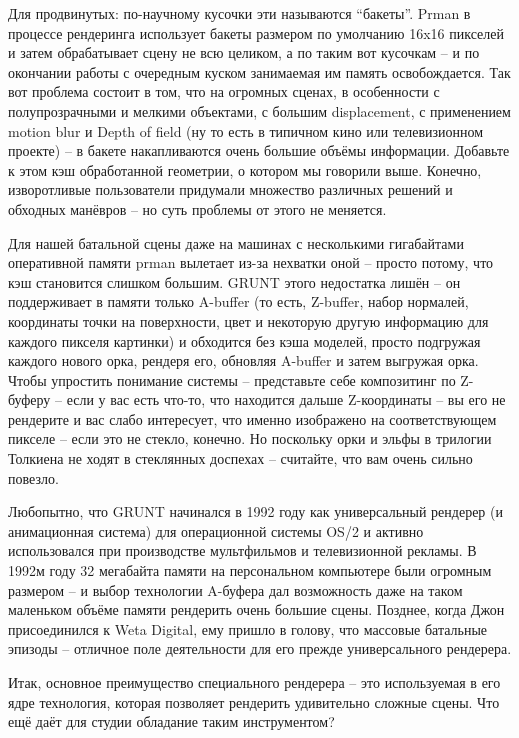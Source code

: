  Для
    продвинутых: по-научному
    кусочки  эти называются
    “бакеты”. Prman в процессе
    рендеринга использует бакеты размером по умолчанию 16x16 пикселей и
    затем обрабатывает сцену не всю целиком, а по таким вот кусочкам –
    и по окончании работы с очередным куском занимаемая им память
    освобождается. Так вот проблема состоит в том, что на огромных
    сценах, в особенности с полупрозрачными и мелкими объектами, с
    большим displacement, с применением motion blur и Depth of field
    (ну то есть в типичном кино или телевизионном проекте) – в бакете
    накапливаются очень большие объёмы информации. Добавьте к этом кэш
    обработанной геометрии, о котором мы говорили выше.  Конечно, изворотливые
    пользователи придумали множество различных решений и обходных
    манёвров – но суть проблемы от этого не меняется.
  

 Для нашей батальной сцены  даже на машинах с несколькими
    гигабайтами оперативной памяти prman вылетает из-за нехватки оной –
    просто потому, что кэш становится слишком большим. GRUNT этого
    недостатка лишён – он поддерживает в памяти только A-buffer (то
    есть, Z-buffer, набор нормалей, координаты точки на поверхности,
    цвет и некоторую другую информацию для каждого пикселя картинки) и
    обходится без кэша моделей, просто подгружая каждого нового орка,
    рендеря его, обновляя A-buffer и затем выгружая орка. Чтобы
    упростить понимание системы – представьте себе композитинг по
    Z-буферу – если у вас есть что-то, что находится дальше
    Z-координаты – вы его не рендерите и вас слабо интересует, что
    именно изображено на соответствующем пикселе – если это не стекло,
    конечно. Но поскольку орки и эльфы в трилогии Толкиена не ходят в
    стеклянных доспехах – считайте, что вам очень сильно
    повезло.
  

 Любопытно, что GRUNT начинался в 1992 году как
    универсальный рендерер (и анимационная система) для операционной
    системы OS/2 и активно использовался при производстве мультфильмов
    и телевизионной рекламы. В 1992м году 32 мегабайта памяти на
    персональном компьютере были огромным размером – и выбор технологии
    A-буфера дал возможность даже на таком маленьком объёме памяти
    рендерить очень большие сцены. Позднее, когда Джон присоединился к
    Weta Digital, ему пришло в голову, что массовые батальные эпизоды –
    отличное поле деятельности для его прежде универсального
    рендерера.
  

 Итак, основное преимущество специального рендерера
    – это используемая в его ядре технология, которая позволяет
    рендерить удивительно сложные сцены. Что ещё даёт для студии
    обладание таким инструментом?
  

